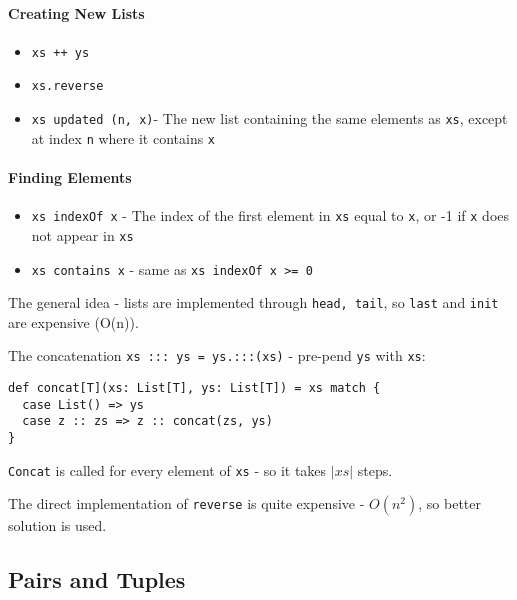 \documentclass{scrartcl}
\begin{document}
\paragraph{Creating New Lists}
\begin{itemize}
\item \lstinline|xs ++ ys|
\item \lstinline|xs.reverse|
\item \lstinline|xs updated (n, x)|- The new list containing the same elements
  as \lstinline|xs|, except at index \lstinline|n| where it contains
  \lstinline|x|
\end{itemize}

\paragraph{Finding Elements}
\begin{itemize}
\item \lstinline|xs indexOf x| - The index of the first element in
  \lstinline|xs| equal to \lstinline|x|, or -1 if \lstinline|x| does not appear
  in \lstinline|xs|
\item \lstinline|xs contains x| - same as \lstinline|xs indexOf x >= 0|
\end{itemize}

The general idea - lists are implemented through \lstinline|head, tail|, so
\lstinline|last| and \lstinline|init| are expensive (O(n)).

The concatenation \lstinline|xs ::: ys = ys.:::(xs)| - pre-pend \lstinline|ys|
with \lstinline|xs|:
\begin{lstlisting}
def concat[T](xs: List[T], ys: List[T]) = xs match {
  case List() => ys
  case z :: zs => z :: concat(zs, ys)
}
\end{lstlisting}
\lstinline|Concat| is called for every element of \lstinline|xs| - so it takes
$|xs|$ steps.

The direct implementation of \lstinline|reverse| is quite expensive - $O(n^2)$,
so better solution is used.

\subsection{Pairs and Tuples}
\label{sec:PairsAndTuples}
\end{document}
